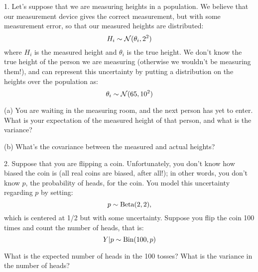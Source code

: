 \documentclass{article}
\begin{document}
1. Let's suppose that we are measuring heights in a population. We believe that our measurement device gives the correct measurement, but with some measurement error, so that our measured heights are distributed:
$$H_i \sim \mathcal{N}(\theta_i, 2^2)$$
where $H_i$ is the measured height and $\theta_i$ is the true height. We don't know the true height of the person we are measuring (otherwise we wouldn't be measuring them!), and can represent this uncertainty by putting a distribution on the heights over the population as:
$$\theta_i \sim \mathcal{N}(65, 10^2)$$

(a) You are waiting in the measuring room, and the next person has yet to enter. What is your expectation of the measured height of that person, and what is the variance?


(b) What's the covariance between the measured and actual heights?


2. Suppose that you are flipping a coin. Unfortunately, you don't know how biased the coin is (all real coins are biased, after all!); in other words, you don't know $p$, the probability of heads, for the coin. You model this uncertainty regarding $p$ by setting:
$$p \sim \textrm{Beta}(2, 2),$$
which is centered at 1/2 but with some uncertainty. Suppose you flip the coin 100 times and count the number of heads, that is:
$$Y|p \sim \textrm{Bin}(100, p)$$

What is the expected number of heads in the 100 tosses? What is the variance in the number of heads?

\end{document}
